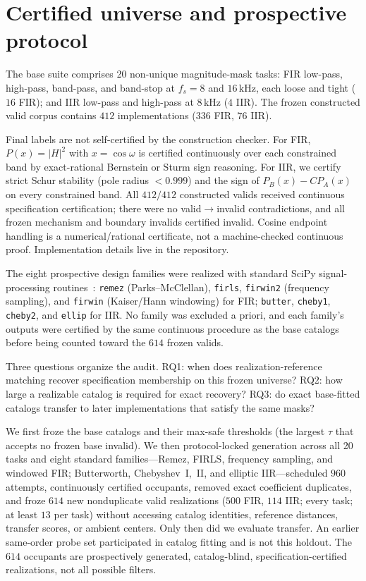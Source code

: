 \documentclass{article}
\begin{document}
\section{Certified universe and prospective protocol}
\label{sec:protocol}

The base suite comprises 20 non-unique magnitude-mask tasks:
FIR low-pass, high-pass, band-pass, and band-stop at
$f_s=8$ and $16\,\mathrm{kHz}$, each loose and tight ($16$ FIR);
and IIR low-pass and high-pass at $8\,\mathrm{kHz}$ ($4$ IIR).
The frozen constructed valid corpus contains $412$
implementations ($336$ FIR, $76$ IIR).

Final labels are not self-certified by the construction checker.
For FIR, $P(x)=\lvert H\rvert^2$ with $x=\cos\omega$ is certified
continuously over each constrained band by exact-rational
Bernstein or Sturm sign reasoning.
For IIR, we certify strict Schur stability (pole radius
$<0.999$) and the sign of $P_B(x)-C P_A(x)$ on every constrained
band.
All $412/412$ constructed valids received continuous
specification certification; there were no valid$\to$invalid
contradictions, and all frozen mechanism and boundary invalids
certified invalid.
Cosine endpoint handling is a numerical/rational certificate, not
a machine-checked continuous proof.
Implementation details live in the repository.

The eight prospective design families were realized with standard
SciPy signal-processing routines~\cite{virtanen2020scipy}:
\texttt{remez} (Parks--McClellan), \texttt{firls}, \texttt{firwin2}
(frequency sampling), and \texttt{firwin} (Kaiser/Hann windowing)
for FIR; \texttt{butter}, \texttt{cheby1}, \texttt{cheby2}, and
\texttt{ellip} for IIR.
No family was excluded a priori, and each family's outputs were
certified by the same continuous procedure as the base catalogs
before being counted toward the $614$ frozen valids.

Three questions organize the audit.
RQ1: when does realization-reference matching recover
specification membership on this frozen universe?
RQ2: how large a realizable catalog is required for exact
recovery?
RQ3: do exact base-fitted catalogs transfer to later
implementations that satisfy the same masks?

We first froze the base catalogs and their max-safe thresholds
(the largest $\tau$ that accepts no frozen base invalid).
We then protocol-locked generation across all 20 tasks and eight
standard families---Remez, FIRLS, frequency sampling, and
windowed FIR; Butterworth, Chebyshev~I,~II, and elliptic
IIR---scheduled $960$ attempts, continuously certified occupants,
removed exact coefficient duplicates, and froze $614$ new
nonduplicate valid realizations ($500$ FIR, $114$ IIR; every
task; at least $13$ per task) without accessing catalog
identities, reference distances, transfer scores, or ambient
centers.
Only then did we evaluate transfer.
An earlier same-order probe set participated in catalog fitting
and is not this holdout.
The $614$ occupants are prospectively generated, catalog-blind,
specification-certified realizations, not all possible filters.
\end{document}
